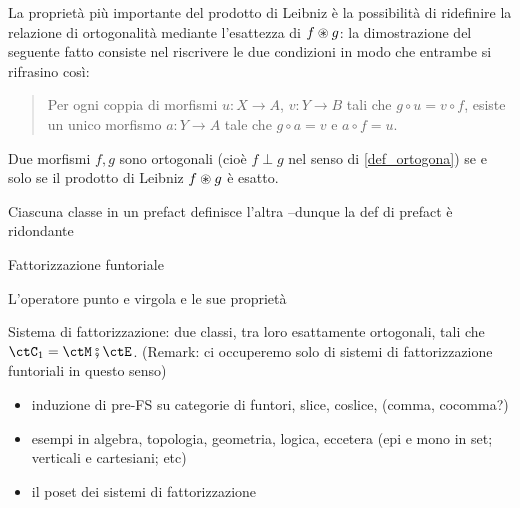 La proprietà più importante del prodotto di Leibniz è la possibilità di ridefinire la relazione di ortogonalità mediante l'esattezza di \(f\oast g\): la dimostrazione del seguente fatto consiste nel riscrivere le due condizioni in modo che entrambe si rifrasino così:
\begin{quote}
	Per ogni coppia di morfismi \(u : X\to A\), \(v : Y\to B\) tali che \(g\circ u=v\circ f\), esiste un unico morfismo \(a : Y\to A\) tale che \(g\circ a=v\) e \(a\circ f=u\).
\end{quote}
\begin{proposition}
	Due morfismi \(f,g\) sono ortogonali (cioè \(f\perp g\) nel senso di \ref{def_ortogona}) se e solo se il prodotto di Leibniz \(f\oast g\) è esatto.
\end{proposition}
\begin{definition}
	\Todo{}
\end{definition}
\begin{proposition}
	Ciascuna classe in un prefact definisce l'altra --dunque la def di prefact è ridondante
\end{proposition}
\begin{definition}
	Fattorizzazione funtoriale
\end{definition}
\begin{definition}
	L'operatore punto e virgola e le sue proprietà
\end{definition}
\begin{definition}
	Sistema di fattorizzazione: due classi, tra loro esattamente ortogonali, tali che \(\ctC_1 = \ctM \fatsemi \ctE\).
	(Remark: ci occuperemo solo di sistemi di fattorizzazione funtoriali in questo senso)
\end{definition}
\begin{itemize}
	\item induzione di pre-FS su categorie di funtori, slice, coslice, (comma, cocomma?)
	\item esempi in algebra, topologia, geometria, logica, eccetera (epi e mono in set; verticali e cartesiani; etc)
	\item il poset dei sistemi di fattorizzazione
\end{itemize}
